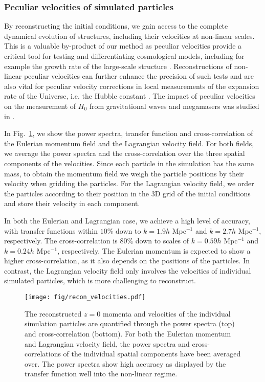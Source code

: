 \subsubsection{Peculiar velocities of simulated particles}
By reconstructing the initial conditions, we gain access to the complete dynamical evolution of structures, including their velocities at non-linear scales. This is a valuable by-product of our method as peculiar velocities provide a critical tool for testing and differentiating cosmological models, including for example the growth rate of the large-scale structure \citep[see e.g.][]{Koda2014,Howlett2017,Boruah2020}. Reconstructions of non-linear peculiar velocities can further enhance the precision of such tests and are also vital for peculiar velocity corrections in local measurements of the expansion rate of the Universe, i.e. the Hubble constant \citep[e.g.][]{Mukherjee2021,Boruah2021,Kenworthy2022,Riess2022,Peterson2022}. The impact of peculiar velocities on the measurement of $H_0$ from gravitational waves and megamasers was studied in \citet{Boruah2021}.  

In Fig.~\ref{fig:dm_vel}, we show the power spectra, transfer function and cross-correlation of the Eulerian momentum field and the Lagrangian velocity field. For both fields, we average the power spectra and the cross-correlation over the three spatial components of the velocities. Since each particle in the simulation has the same mass, to obtain the momentum field we weigh the particle positions by their velocity when gridding the particles. For the Lagrangian velocity field, we order the particles according to their position in the $3$D grid of the initial conditions and store their velocity in each component. 

In both the Eulerian and Lagrangian case, we achieve a high level of accuracy, with transfer functions within $10\%$ down to $k=1.9h$ Mpc$^{-1}$ and $k=2.7h$ Mpc$^{-1}$, respectively. The cross-correlation is $80\%$ down to scales of $k=0.59h$ Mpc$^{-1}$ and $k=0.24h$ Mpc$^{-1}$, respectively. The Eulerian momentum is expected to show a higher cross-correlation, as it also depends on the positions of the particles. In contrast, the Lagrangian velocity field only involves the velocities of individual simulated particles, which is more challenging to reconstruct.

\begin{figure}
    \centering
    \texttt{[image: fig/recon\_velocities.pdf]}
    \caption{The reconstructed $z=0$ momenta and velocities of the individual simulation particles are quantified through the power spectra (top) and cross-correlation (bottom). For both the Eulerian momentum and Lagrangian velocity field, the power spectra and cross-correlations of the individual spatial components have been averaged over. The power spectra show high accuracy as displayed by the transfer function well into the non-linear regime. }
    \label{fig:dm_vel}
\end{figure}

